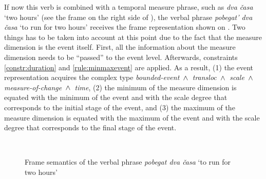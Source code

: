 If now this verb is combined with a temporal measure phrase, such as \textit{dva \v{c}asa} `two hours' (see the frame on the right side of ), the verbal phrase \textit{pobegat' dva \v{c}asa} `to run for two hours' receives the frame representation shown on . Two things has to be taken into account at this point due to the fact that the measure dimension is the event itself. First, all the information about the measure dimension needs to be ``passed'' to the event level. Afterwards, constraints \ref{constr:duration} and \ref{rule:minmaxevent} are applied. As a result, (1) the event representation acquires the complex type \textit{bounded-event $\,\wedge\,$ transloc $\,\wedge\,$ scale $\,\wedge\,$ measure-of-change $\,\wedge\,$ time}, (2) the minimum of the measure dimension is equated with the minimum of the event and with the scale degree that corresponds to the initial stage of the event, and (3) the maximum of the measure dimension is equated with the maximum of the event and with the scale degree that corresponds to the final stage of the event.

\begin{figure}
\centering
{}\\
\caption{Frame semantics of the verbal phrase \textit{pobegat dva \v{c}asa} `to run for two hours' \label{frame:pobegat:2hours}}
\end{figure}


